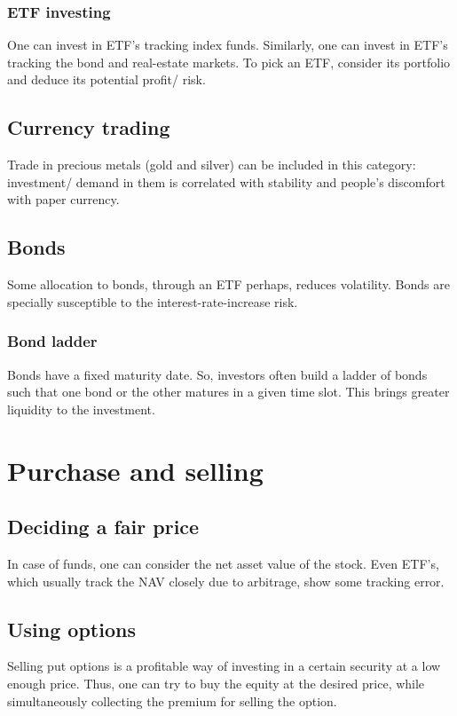 \documentclass[oneside, article]{memoir}
\begin{document}
\subsubsection{ETF investing}
One can invest in ETF's tracking index funds. Similarly, one can invest in ETF's tracking the bond and real-estate markets. To pick an ETF, consider its portfolio and deduce its potential profit/ risk.

\subsection{Currency trading}
Trade in precious metals (gold and silver) can be included in this category: investment/ demand in them is correlated with stability and people's discomfort with paper currency.

\subsection{Bonds}
Some allocation to bonds, through an ETF perhaps, reduces volatility. Bonds are specially susceptible to the interest-rate-increase risk.

\subsubsection{Bond ladder}
Bonds have a fixed maturity date. So, investors often build a ladder of bonds such that one bond or the other matures in a given time slot. This brings greater liquidity to the investment.

\section{Purchase and selling}
\subsection{Deciding a fair price}
In case of funds, one can consider the net asset value of the stock. Even ETF's, which usually track the NAV closely due to arbitrage, show some tracking error.

\subsection{Using options}
Selling put options is a profitable way of investing in a certain security at a low enough price. Thus, one can try to buy the equity at the desired price, while simultaneously collecting the premium for selling the option.
\end{document}
